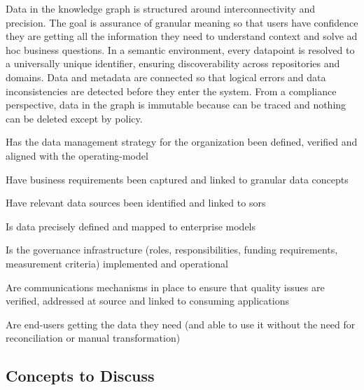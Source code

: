 %
%

\ekgmmContextSection

Data in the knowledge graph is structured around interconnectivity and precision.
The goal is assurance of granular meaning so that users have confidence they are getting all the information they
need to understand context and solve ad hoc business questions.
In a semantic environment, every datapoint is resolved to a universally unique identifier, ensuring discoverability
across repositories and domains.
Data and metadata are connected so that logical errors and data inconsistencies are detected before they enter
the system.
From a compliance perspective, data in the graph is immutable because  can be traced and
nothing can be deleted except by policy.

\ekgmmcorequestionssection

\begin{core-questions}

  \item [\thesection.1] Has the data management strategy for the organization been defined, verified and aligned
                        with the \gls{operating-model}
  \item [\thesection.2] Have business requirements been captured and linked to granular data concepts
  \item [\thesection.3] Have relevant data sources been identified and linked to \glspl{sor}
  \item [\thesection.4] Is data precisely defined and mapped to enterprise models
  \item [\thesection.5] Is the governance infrastructure (roles, responsibilities, funding requirements,
                        measurement criteria) imple\-mented and operational
  \item [\thesection.6] Are communications mechanisms in place to ensure that quality issues are verified,
                        addressed at source and linked to consuming applications
  \item [\thesection.7] Are end-users getting the data they need (and able to use it without the need for
                        reconciliation or manual transformation)

\end{core-questions}

\subsection*{Concepts to Discuss}

